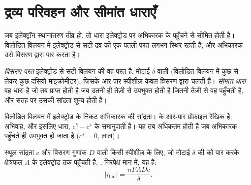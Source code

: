 \section{द्रव्य परिवहन और सीमांत धाराएँ}

जब इलेक्ट्रॉन स्थानांतरण तीव्र हो, तो धारा इलेक्ट्रोड पर अभिकारक के पहुँचने से
सीमित होती है। विलोडित विलयन में इलेक्ट्रोड से सटी द्रव की एक पतली परत
लगभग स्थिर रहती है, और अभिकारक उसे विसरण द्वारा
पार करता है।

\begin{definition}\label{def:b2:current-potential-curves:limiting-current}
\emph{विसरण परत} इलेक्ट्रोड से सटी विलयन की वह परत है,
मोटाई $\delta$ वाली (विलोडित विलयन में कुछ से लेकर कुछ दसियों माइक्रोमीटर),
जिसके आर-पार स्पीशीज़ केवल विसरण द्वारा
चलती हैं। \emph{सीमांत धारा} वह धारा है
जो तब प्राप्त होती है जब  उतनी ही तेज़ी से उपभुक्त होती है जितनी तेज़ी से वह पहुँचती है, और
सतह पर उसकी सांद्रता शून्य होती है।
\end{definition}

\begin{omfigure}

{\small विलोडित विलयन में इलेक्ट्रोड के निकट अभिकारक की सांद्रता।
 के आर-पार प्रोफ़ाइल रैखिक है; अभिवाह, और इसलिए
धारा, $c^b - c^s$ के समानुपाती है। यह तब अधिकतम होती है जब अभिकारक
पहुँचते ही उपभुक्त हो जाता है ($c^s = 0$, लाल)।}
\end{omfigure}

\begin{theorem}[सीमांत धारा]\label{thm:b2:current-potential-curves:limiting}
स्थूल सांद्रता $c$ और विसरण गुणांक $D$ वाली किसी स्पीशीज़ के लिए,
जो मोटाई $\delta$ की  को पार करके क्षेत्रफल $A$ के इलेक्ट्रोड तक पहुँचती है,
, निरपेक्ष मान में, यह है:
\[
  |i_{\lim}| = \frac{nFADc}{\delta} .
\]
\end{theorem}

